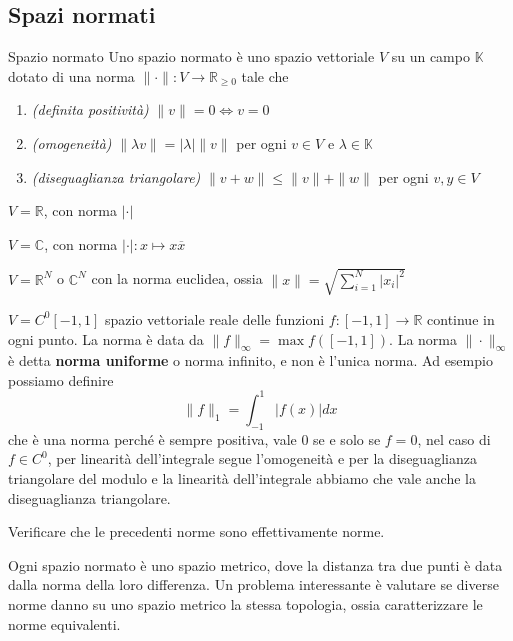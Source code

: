 \subsection{Spazi normati}
\begin{definition}{Spazio normato}
    Uno spazio normato è uno spazio vettoriale \(V\) su un campo \(\mathbb{K}\)
    dotato di una norma \(\| \cdot \| : V \to \mathbb{R}_{\ge 0} \) tale che
    \begin{enumerate}[label = \arabic*.]
        \item \emph{(definita positività)} \(\| v \| = 0 \iff v = 0\)
        \item \emph{(omogeneità)} \(\| \lambda v \| = |\lambda| \| v \|\) per ogni \(v \in V\) e
            \(\lambda \in \mathbb{K}\)
        \item \emph{(diseguaglianza triangolare)} \(\| v + w \| \le \| v \| + \| w \|\) per ogni \(v, y \in V\)
    \end{enumerate}
\end{definition}
\begin{example}
    \(V = \mathbb{R}\), con norma \(|\cdot |\)
\end{example}
\begin{example}
    \(V=\mathbb{C}\), con norma \(| \cdot | : x \mapsto x \overline{x}\)
\end{example}
\begin{example}
    \(V = \mathbb{R}^{N}\) o \(\mathbb{C}^{N}\) con la norma euclidea, ossia
\(\|x\| = \sqrt{\sum_{i=1}^{N} |x_i|^2}\)
\end{example}
\begin{example}
    \(V = C^{0}[-1, 1]\) spazio vettoriale reale delle funzioni \(f : [-1, 1]
    \to \mathbb{R} \) continue in ogni punto. La norma è data da
    \(\|f\|_{\infty} = \max f([-1, 1]) \).
    La norma \(\| \cdot \|_{\infty}\) è detta \textbf{norma uniforme} o norma
    infinito, e non è l'unica norma. Ad esempio possiamo definire
    \[
        \|f\|_{1} = \int_{-1}^{1} |f(x)| dx
    \]
    che è una norma perché è sempre positiva, vale 0 se e solo se \(f = 0\), nel
    caso di \(f \in C^{0}\), per linearità dell'integrale segue l'omogeneità e
    per la diseguaglianza triangolare del modulo e la linearità dell'integrale
    abbiamo che vale anche la diseguaglianza triangolare.
\end{example}
\begin{eser}
    Verificare che le precedenti norme sono effettivamente norme.
\end{eser}
Ogni spazio normato è uno spazio metrico, dove la distanza tra due punti è data
dalla norma della loro differenza. Un problema interessante è valutare se
diverse norme danno su uno spazio metrico la stessa topologia, ossia
caratterizzare le norme equivalenti.

